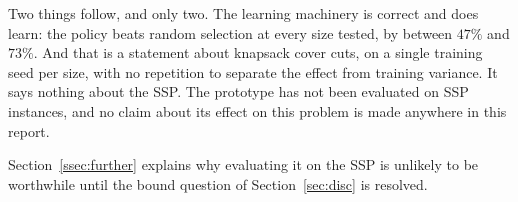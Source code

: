 Two things follow, and only two. The learning machinery is correct and does learn: the
policy beats random selection at every size tested, by between $47\%$ and $73\%$. And
that is a statement about knapsack cover cuts, on a single training seed per size, with
no repetition to separate the effect from training variance. It says nothing about the
SSP. The prototype has not been evaluated on SSP instances, and no claim about its
effect on this problem is made anywhere in this report.

Section~\ref{ssec:further} explains why evaluating it on the SSP is unlikely to be
worthwhile until the bound question of Section~\ref{sec:disc} is resolved.
